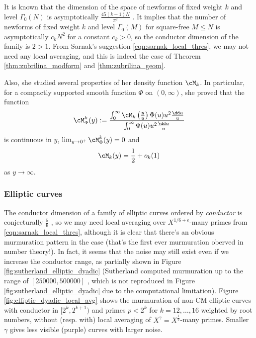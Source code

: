 It is known that the dimension of the space of newforms of fixed weight $k$ and level $\Gamma_0(N)$ is asymptotically $\frac{45(k-1)N}{\pi^2}$ \cite[Theorem 8]{martin2005dimensions}.
It implies that the number of newforms of fixed weight $k$ and level $\Gamma_0(M)$ for square-free $M \le N$ is asymptotically $c_k N^2$ for a constant $c_k > 0$, so the conductor dimension of the family is $2 > 1$.
From Sarnak's suggestion \eqref{eqn:sarnak_local_thres}, we may not need any local averaging, and this is indeed the case of Theorem \ref{thm:zubrilina_modform} and \ref{thm:zubrilina_geom}.

Also, she studied several properties of her density function $\cM_k$.
In particular, for a compactly supported smooth function $\Phi$ on $(0, \infty)$, she proved that the function
\begin{equation}
    \cM_{\Phi}^k(y) := \frac{\int_0^\infty \cM_k\left(\frac{y}{u}\right) \Phi(u) u^2 \frac{\dd u}{u}}{\int_0^\infty \Phi(u) u^2 \frac{\dd u}{u}}
\end{equation}
is continuous in $y$, $\lim_{y \to 0^+} \cM_{\Phi}^k(y) = 0$ and
\[
\cM_k(y) = \frac{1}{2} + o_k(1)
\]
as $y \to \infty$.

\subsubsection{Elliptic curves}

The conductor dimension of a family of elliptic curves ordered by \emph{conductor} is conjecturally $\frac{5}{6}$ \cite{shankar2019families}, so we may need local averaging over $X^{1/6 + \epsilon}$-many primes from \eqref{eqn:sarnak_local_thres}, although it is clear that there's an obvious murmuration pattern in the case (that's the first ever murmuration oberved in number theory!).
In fact, it seems that the noise may still exist even if we increase the conductor range, as partially shown in Figure \ref{fig:sutherland_elliptic_dyadic} (Sutherland computed murmuration up to the range of $[250000, 500000]$ \cite{sutherlandletter}, which is not reproduced in Figure \ref{fig:sutherland_elliptic_dyadic} due to the computational limitation).
Figure \ref{fig:elliptic_dyadic_local_avg} shows the murmuration of non-CM elliptic curves with conductor in $[2^k, 2^{k+1})$ and primes $p < 2^k$ for $k = 12, \dots, 16$ weighted by root numbers, without (resp. with) local averaging of $X^\gamma = X^{\frac{1}{2}}$-many primes.
Smaller $\gamma$ gives less visible (purple) curves with larger noise.


